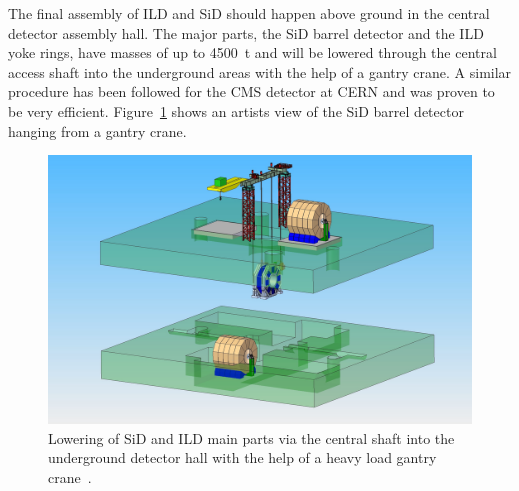 The final assembly of ILD and SiD should happen above ground in the central detector assembly hall. The major parts, the SiD barrel detector and the ILD yoke rings, have masses of up to 4500~t and will be lowered through the central access shaft into the underground areas with the help of a gantry crane. A similar procedure has been followed for the CMS detector at CERN and was proven to be very efficient. Figure~\ref{fig:integration:gantry_crane} shows an artists view of the SiD barrel detector hanging from a gantry crane.
\begin{figure}[h!]
\centering
\includegraphics[width=0.8\hsize]{Integration/fig/gantry_crane.png}
\caption{\label{fig:integration:gantry_crane}Lowering of SiD and ILD main parts via the central shaft into the underground detector hall with the help of a heavy load gantry crane~\cite{ild:bib:gantry_crane}.}
\end{figure}

